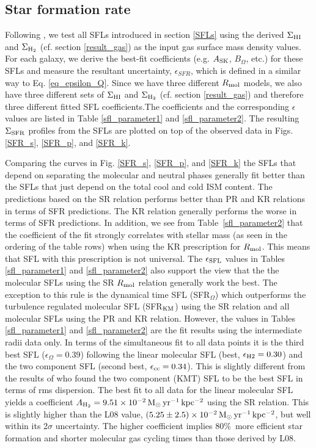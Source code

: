 \documentclass[12pt,preprint]{aastex}
\begin{document}
\subsection{Star formation rate}\label{result_sfr}
Following \citet{tan10}, we test all SFLs introduced in section \ref{SFLs} using the derived $\Sigma_{\rm HI}$ and $\Sigma_{\rm H_2}$ (cf. section \ref{result_gas}) as the input gas surface mass density values.  For each galaxy, we derive the best-fit coefficients (e.g. $A_{\rm SK}$, $B_{\Omega}$, etc.) for these SFLs and measure the resultant uncertainty, $\epsilon_{SFR}$, which is defined in a similar way to Eq. \ref{eq_epsilon_Q}.  
Since we have three different $R_{\rm mol}$ models, we also have three different sets of $\Sigma_{\rm HI}$ and $\Sigma_{\rm H_2}$ (cf. section \ref{result_gas}) and therefore three different fitted SFL coefficients.The coefficients and the corresponding $\epsilon$ values are listed in Table \ref{sfl_parameter1} and \ref{sfl_parameter2}. The resulting $\Sigma_{\rm SFR}$ profiles from the SFLs are plotted on top of the observed data in Figs. \ref{SFR_s}, \ref{SFR_p}, and \ref{SFR_k}.  


Comparing the curves in Fig. \ref{SFR_s}, \ref{SFR_p}, and \ref{SFR_k} 
the SFLs that depend on separating the molecular and neutral phases generally fit better than the SFLs that just depend on the total cool and cold ISM content.  The predictions based on the SR relation performs better than PR and KR relations in terms of SFR predictions.  The KR relation generally performs the worse in terms of SFR predictions.  In addition, we see from Table~\ref{sfl_parameter2} that the coefficient of the fit strongly correlates with stellar mass (as seen in the ordering of the table rows) when using the KR prescription for $R_{\rm mol}$.  This means that SFL with this prescription is not universal.
The $\epsilon_{\rm SFL}$  values in Tables \ref{sfl_parameter1} and \ref{sfl_parameter2} also support the view that the the molecular SFLs using the SR $R_{\rm mol}$ relation generally work the best. 
The exception to this rule is the dynamical time SFL (SFR$_\Omega$) which outperforms the turbulence regulated molecular SFL (SFR$_{\rm KM}$) using the SR relation and all molecular SFLs using the PR and KR relation.  
However, the values in Tables \ref{sfl_parameter1} and \ref{sfl_parameter2} are the fit results using the intermediate radii data only. 
In terms of the simultaneous fit to all data points it is the third best SFL ($\epsilon_\Omega = 0.39$) following the linear molecular SFL (best, $\epsilon_{\rm H2} = 0.30$) and the two component SFL (second best, $\epsilon_{\rm cc} = 0.34$).  This is slightly different from the results of \citet{tan10} who found the two component   (KMT) SFL to be the best SFL in terms of rms dispersion. The best fit to all data for the linear molecular SFL yields a coefficient $A_{\rm H_2}=9.51\times  10^{-2}\, {\rm M_{\odot}\, yr^{-1}\, kpc^{-2}}$ using the SR relation.  This is slightly higher than the L08 value, $(5.25\pm 2.5)\times 10^{-2}\, {\rm M_{\odot}\, yr^{-1}\, kpc^{-2}}$, but  well within its 2$\sigma$ uncertainty.  The higher coefficient implies 80\%\ more efficient star formation and shorter molecular gas cycling times than those derived by L08.
\end{document}
